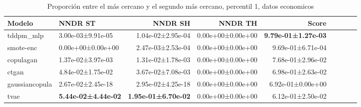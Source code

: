 \begin{table}[H]
\centering
\fontsize{10}{14}\selectfont
\caption{Proporción entre el más cercano y el segundo más cercano, percentil 1, datos economicos}
\label{table-dcr-economicos-a}
\begin{tabular}{|l|l|r|r|r|r|r|r|r|}
\hline
\rowcolor[gray]{0.8}
Modelo & NNDR ST & NNDR SH & NNDR TH & \textbf{Score} \\
\hline tddpm\_mlp & 3.00e-03±9.91e-05 & 1.04e-02±2.95e-04 & 0.00e+00±0.00e+00 & \bfseries 9.79e-01±1.27e-03 \\
\hline smote-enc & \cellcolor[rgb]{0.9, 0.54, 0.52} 0.00e+00±0.00e+00 & \cellcolor[rgb]{0.9, 0.54, 0.52} 2.47e-03±2.53e-04 & 0.00e+00±0.00e+00 & 9.69e-01±6.71e-04 \\
\hline copulagan & 1.37e-02±3.97e-03 & 1.31e-02±1.78e-03 & 0.00e+00±0.00e+00 & 7.68e-01±2.96e-02 \\
\hline ctgan & 4.84e-02±1.75e-02 & 3.67e-02±7.08e-03 & 0.00e+00±0.00e+00 & 6.98e-01±2.63e-02 \\
\hline gaussiancopula & 2.67e-02±2.45e-18 & 2.95e-02±4.25e-18 & 0.00e+00±0.00e+00 & 6.92e-01±0.00e+00 \\
\hline tvae & \bfseries 5.44e-02±4.44e-02 & \bfseries 1.95e-01±6.70e-02 & 0.00e+00±0.00e+00 & \cellcolor[rgb]{0.9, 0.54, 0.52} 6.12e-01±2.50e-02 \\
\hline
\end{tabular}
\end{table}
